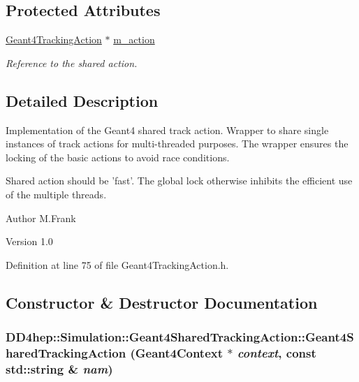 \subsection*{Protected Attributes}
\begin{DoxyCompactItemize}
\item 
\hyperlink{class_d_d4hep_1_1_simulation_1_1_geant4_tracking_action}{Geant4TrackingAction} $\ast$ \hyperlink{class_d_d4hep_1_1_simulation_1_1_geant4_shared_tracking_action_ab28be90db22491588dd12675fd21d8cb}{m\_\-action}
\begin{DoxyCompactList}\small\item\em Reference to the shared action. \item\end{DoxyCompactList}\end{DoxyCompactItemize}


\subsection{Detailed Description}
Implementation of the Geant4 shared track action. Wrapper to share single instances of track actions for multi-\/threaded purposes. The wrapper ensures the locking of the basic actions to avoid race conditions.

Shared action should be 'fast'. The global lock otherwise inhibits the efficient use of the multiple threads.

\begin{DoxyAuthor}{Author}
M.Frank 
\end{DoxyAuthor}
\begin{DoxyVersion}{Version}
1.0 
\end{DoxyVersion}


Definition at line 75 of file Geant4TrackingAction.h.

\subsection{Constructor \& Destructor Documentation}
\hypertarget{class_d_d4hep_1_1_simulation_1_1_geant4_shared_tracking_action_a1b88cc76ae24b37f456539fc9ee2e7ab}{
\subsubsection[{Geant4SharedTrackingAction}]{\setlength{\rightskip}{0pt plus 5cm}DD4hep::Simulation::Geant4SharedTrackingAction::Geant4SharedTrackingAction ({\bf Geant4Context} $\ast$ {\em context}, \/  const std::string \& {\em nam})}}
\label{class_d_d4hep_1_1_simulation_1_1_geant4_shared_tracking_action_a1b88cc76ae24b37f456539fc9ee2e7ab}


